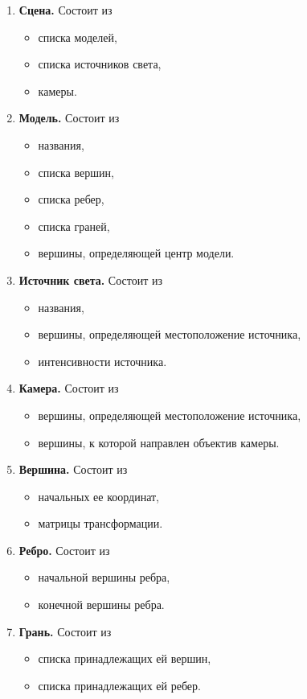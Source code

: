 \begin{enumerate}
	\item \textbf{Сцена.} Состоит из
	\begin{itemize}[label=---]
		\item списка моделей,
		\item списка источников света,
		\item камеры.
	\end{itemize}
	\item \textbf{Модель.} Состоит из
	\begin{itemize}[label=---]
		\item названия,
		\item списка вершин,
		\item списка ребер,
		\item списка граней,
		\item вершины, определяющей центр модели.
	\end{itemize}
	\item \textbf{Источник света.} Состоит из
	\begin{itemize}[label=---]
		\item названия,
		\item вершины, определяющей местоположение источника,
		\item интенсивности источника.
	\end{itemize}
	\item \textbf{Камера.} Состоит из
	\begin{itemize}[label=---]
		\item вершины, определяющей местоположение источника,
		\item вершины, к которой направлен объектив камеры.
	\end{itemize}
	\item \textbf{Вершина.} Состоит из
	\begin{itemize}[label=---]
		\item начальных ее координат,
		\item матрицы трансформации.
	\end{itemize}
	\item \textbf{Ребро.} Состоит из
	\begin{itemize}[label=---]
		\item начальной вершины ребра,
		\item конечной вершины ребра.
	\end{itemize}
	\item \textbf{Грань.} Состоит из
	\begin{itemize}[label=---]
		\item списка принадлежащих ей вершин,
		\item списка принадлежащих ей ребер.
	\end{itemize}
\end{enumerate}


